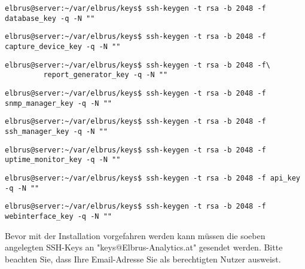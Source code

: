 \documentclass{article}
\begin{document}
	\begin{lstlisting}[caption={Erstellen des SSH-keys der für das Herunterladen der 'Database' benötigt wird.}]
		elbrus@server:~/var/elbrus/keys$ ssh-keygen -t rsa -b 2048 -f database_key -q -N ""
	\end{lstlisting}

	\begin{lstlisting}[caption={Erstellen des SSH-keys der für das Herunterladen des 'Capture-Device' benötigt wird.}]
		elbrus@server:~/var/elbrus/keys$ ssh-keygen -t rsa -b 2048 -f capture_device_key -q -N ""
	\end{lstlisting}

	\begin{lstlisting}[caption={Erstellen des SSH-keys der für das Herunterladen des 'Report-Generator' benötigt wird.}]
		elbrus@server:~/var/elbrus/keys$ ssh-keygen -t rsa -b 2048 -f\
		 report_generator_key -q -N ""
	\end{lstlisting}

	\begin{lstlisting}[caption={Erstellen des SSH-keys der für das Herunterladen des 'SNMP-Managers' benötigt wird.}]
		elbrus@server:~/var/elbrus/keys$ ssh-keygen -t rsa -b 2048 -f snmp_manager_key -q -N ""
	\end{lstlisting}

	\begin{lstlisting}[caption={Erstellen des SSH-keys der für das Herunterladen des 'SSH-Managers' benötigt wird.}]
		elbrus@server:~/var/elbrus/keys$ ssh-keygen -t rsa -b 2048 -f ssh_manager_key -q -N ""
	\end{lstlisting}
	
	\begin{lstlisting}[caption={Erstellen des SSH-keys der für das Herunterladen des 'Uptime-Monitors' benötigt wird.}]
		elbrus@server:~/var/elbrus/keys$ ssh-keygen -t rsa -b 2048 -f uptime_monitor_key -q -N ""
	\end{lstlisting}
	
	\begin{lstlisting}[caption={Erstellen des SSH-keys der für das Herunterladen der 'API' benötigt wird.}]
		elbrus@server:~/var/elbrus/keys$ ssh-keygen -t rsa -b 2048 -f api_key -q -N ""
	\end{lstlisting}
	
	\begin{lstlisting}[caption={Erstellen des SSH-keys der für das Herunterladen des 'Webinterfaces' benötigt wird.}]
		elbrus@server:~/var/elbrus/keys$ ssh-keygen -t rsa -b 2048 -f webinterface_key -q -N ""
	\end{lstlisting}
	Bevor mit der Installation vorgefahren werden kann müssen die soeben angelegten SSH-Keys an "keys@Elbrus-Analytics.at" gesendet werden. Bitte beachten Sie, dass Ihre Email-Adresse Sie als berechtigten Nutzer ausweist.
	
\end{document}

